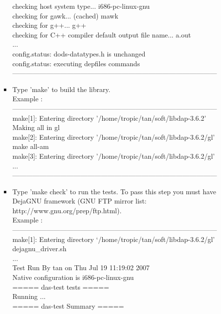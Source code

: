\begin{itemize}
\begin{itemize}
\begin{itemize}
checking host system type... i686-pc-linux-gnu\\
checking for gawk... (cached) mawk\\
checking for g++... g++\\
checking for C++ compiler default output file name... a.out\\
...\\
config.status: dods-datatypes.h is unchanged\\
config.status: executing depfiles commands\\
------------------------------------------------------------------------------------------\\
\item Type 'make' to build the library.\\
Example :\\
------------------------------------------------------------------------------------------\\
make[1]: Entering directory '/home/tropic/tan/soft/libdap-3.6.2'\\
Making all in gl\\
make[2]: Entering directory '/home/tropic/tan/soft/libdap-3.6.2/gl'\\
make  all-am\\
make[3]: Entering directory '/home/tropic/tan/soft/libdap-3.6.2/gl'\\
...\\
------------------------------------------------------------------------------------------\\
\item Type 'make check' to run the tests. To pass this step you 
must have DejaGNU framework (GNU FTP mirror list:
http://www.gnu.org/prep/ftp.html).\\
Example :\\
------------------------------------------------------------------------------------------\\
make[1]: Entering directory `/home/tropic/tan/soft/libdap-3.6.2/gl'\\
dejagnu\_driver.sh\\
...\\
Test Run By tan on Thu Jul 19 11:19:02 2007\\
Native configuration is i686-pc-linux-gnu\\
                ===== das-test tests =====\\
		Running ...\\
                ===== das-test Summary =====\\		

\end{itemize}
\end{itemize}
\end{itemize}
